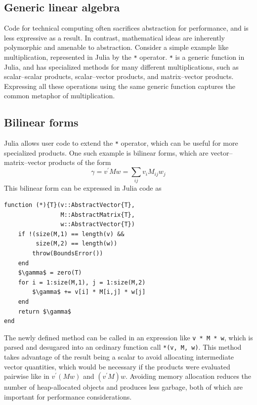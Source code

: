 \documentclass[10pt, preprint]{sigplanconf}
\begin{document}
\subsection{Generic linear algebra}

Code for technical computing often sacrifices abstraction for performance,
and is less expressive as a result. In contrast, mathematical ideas are
inherently polymorphic and amenable to abstraction. Consider a simple example
like multiplication, represented in Julia by the \lstinline|*| operator.
\lstinline|*| is a generic function in Julia, and has specialized methods for
many different multiplications, such as scalar--scalar products, scalar--vector
products, and matrix--vector products. Expressing all these operations using
the same generic function captures the common metaphor of multiplication.

\subsection{Bilinear forms}

Julia allows user code to extend the \lstinline|*| operator, which can be
useful for more specialized products. One such example is bilinear forms, which
are vector--matrix--vector products of the form
%
\begin{equation}
\gamma = v^\prime M w = \sum_{ij} v_i M_{ij} w_j
\end{equation}
%
This bilinear form can be expressed in Julia code as
%
\begin{lstlisting}
function (*){T}(v::AbstractVector{T},
                M::AbstractMatrix{T},
                w::AbstractVector{T})
    if !(size(M,1) == length(v) &&
         size(M,2) == length(w))
        throw(BoundsError())
    end
    $\gamma$ = zero(T)
    for i = 1:size(M,1), j = 1:size(M,2)
        $\gamma$ += v[i] * M[i,j] * w[j]
    end
    return $\gamma$
end
\end{lstlisting}
%
The newly defined method can be called in an expression like
\lstinline|v * M * w|, which is parsed and desugared into an ordinary function
call \lstinline|*(v, M, w)|. This method takes advantage of the result being a
scalar to avoid allocating intermediate vector quantities, which would be
necessary if the products were evaluated pairwise like in $v^\prime(Mw)$ and
$(v^\prime M) w$. Avoiding memory allocation reduces the number of
heap-allocated objects and produces less garbage, both of which are important
for performance considerations.
\end{document}
